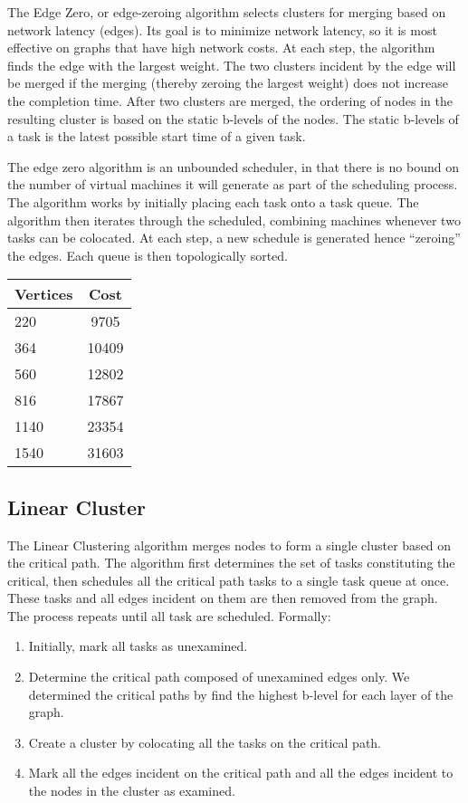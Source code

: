 \documentclass[11pt, oneside]{article}   	%
\begin{document}
The Edge Zero, or edge-zeroing algorithm selects clusters for merging based on network latency (edges). Its goal is to minimize network latency, so it is most effective on graphs that have high network costs. At each step, the algorithm finds the edge with the largest weight. The two clusters incident by the edge will be merged if the merging (thereby zeroing the largest weight) does not increase the completion time. After two clusters are merged, the ordering of nodes in the resulting cluster is based on the static b-levels of the nodes. The static b-levels of a task is the latest possible start time of a given task.

The edge zero algorithm is an unbounded scheduler, in that there is no bound on the number of virtual machines it will generate as part of the scheduling process. The algorithm works by initially placing each task onto a task queue. The algorithm then iterates through the scheduled, combining machines whenever two tasks can be colocated. At each step, a new schedule is generated hence ``zeroing'' the edges. Each queue is then topologically sorted.

\begin{center}
\begin{tabular}{| l | c |}
  \hline
  Vertices & Cost \\ \hline
  220 & 9705 \\
  364 & 10409 \\
  560 & 12802 \\
  816 & 17867 \\
  1140 & 23354 \\
  1540 & 31603 \\
  \hline			
\end{tabular}
\end{center}

\subsection{Linear Cluster}

The Linear Clustering algorithm merges nodes to form a single cluster based on the critical path. The algorithm first determines the set of tasks constituting the critical, then schedules all the critical path tasks to a single task queue at once. These tasks and all edges incident on them are then removed from the graph. The process repeats until all task are scheduled. Formally:

\begin{enumerate}
\item Initially, mark all tasks as unexamined.
\item Determine the critical path composed of unexamined edges only. We determined the critical paths by find the highest b-level for each layer of the graph.
\item Create a cluster by colocating all the tasks on the critical path.
\item Mark all the edges incident on the critical path and all the edges incident to the
nodes in the cluster as examined.
\end{enumerate}
\end{document}
